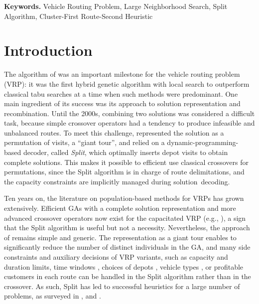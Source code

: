 \documentclass[11pt]{article}
\newcommand{\blue}[1]{{#1}}
\begin{document}
\noindent
\textbf{Keywords.} Vehicle Routing Problem, Large Neighborhood Search, Split Algorithm, Cluster-First Route-Second Heuristic

\vspace*{0.3cm}

\section{Introduction}

The algorithm of \cite{Prins2004} was an important milestone for the vehicle routing problem (VRP): it was the first hybrid genetic algorithm with local search to outperform classical tabu searches at a time when such methods were predominant.
One main ingredient of its success was its approach to solution representation and recombination. 
Until the 2000s, combining two solutions was considered a difficult task, because simple crossover operators had a tendency to produce infeasible and unbalanced routes. 
To meet this challenge, \cite{Prins2004} represented the solution as a permutation of visits, a ``giant tour'', and relied on a dynamic-programming-based decoder, called \emph{Split}, which optimally inserts depot visits to obtain complete solutions.
This makes it possible to efficient use classical crossovers for permutations, since the Split algorithm is in charge of route delimitations, and the capacity constraints are implicitly managed during solution~decoding.

\blue{
Ten years on, the literature on population-based methods for VRPs has grown extensively.
Efficient GAs with a complete solution representation and more advanced crossover operators now exist for the capacitated VRP (e.g.,  \citealt{Nagata2009}), a sign that the Split algorithm is useful but not a necessity. Nevertheless, the approach of \cite{Prins2004} remains simple and generic. The representation as a giant tour enables to significantly reduce the number of distinct individuals in the GA, and many side constraints and auxiliary decisions of VRP variants, such as capacity and duration limits, time windows \citep{Vidal2012c}, choices of depots \citep{Duhamel2010}, vehicle types \citep{Duhamel2011a}, or profitable customers in each route \citep{Vidal2014} can be handled in the Split algorithm rather than in the crossover.
As such, Split has led to successful heuristics for a large number of problems, as surveyed in \cite{Duhamel2011a,Vidal2012,Prins2014}, and \cite{Laporte2014a}.
}
\end{document}
